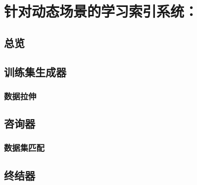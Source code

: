 \chapter{针对动态场景的学习索引系统：\sys}
\label{chap:sys}

\section{总览}

\section{训练集生成器}

\subsection{数据拉伸}

\section{咨询器}

\subsection{数据集匹配}

\section{终结器}
